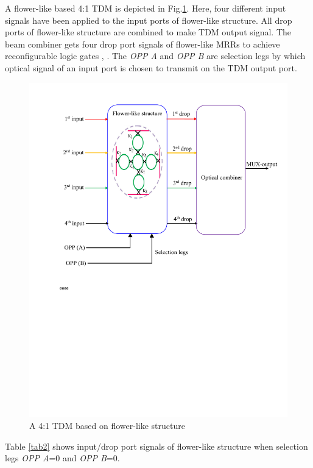 \documentclass{osa-article}
\begin{document}
A flower-like based 4:1 TDM is depicted in Fig.\ref{fig2_combiner}. Here, four different input signals have been applied to the input ports of flower-like structure. All drop ports of flower-like structure are combined to make TDM output signal. The beam combiner gets four drop port signals of flower-like MRRs to achieve reconfigurable logic gates \cite{bloembergen1996nonlinear}, \cite{shen1984principles}. The \textit{OPP A} and \textit{OPP B} are selection legs by which optical signal of an input port is chosen to transmit on the TDM output port. 
\begin{figure}
\centering
	\includegraphics[width=3.5 in]{figs/fig2_combiner.pdf}
	\caption{A 4:1 TDM based on flower-like structure}
	\label{fig2_combiner}
\end{figure}
Table \ref{tab2} shows input/drop port signals of flower-like structure when selection legs \textit{OPP A}=0 and \textit{OPP B}=0.
\end{document}
